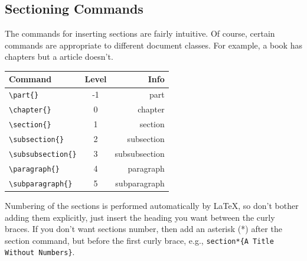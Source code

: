 \documentclass{article}%
\begin{document}
\subsection{Sectioning Commands}
\label{sec:sectioning-commands}
The commands for inserting sections are fairly intuitive.  Of course,
certain commands are appropriate to different document classes.  For
example, a book has chapters but a article doesn't.
\begin{center}
  \begin{tabular}{|l|c|r|}%
    \hline %
    Command & Level & Info \\ %
    \hline
    \verb|\part{}| & -1 & part\\
     \verb|\chapter{}| & 0 &chapter\\
     \verb|\section{}| & 1 &section\\
     \verb|\subsection{}| & 2 &subsection\\
     \verb|\subsubsection{}| & 3 &subsubsection\\
     \verb|\paragraph{}| & 4 & paragraph\\
     \verb|\subparagraph{}| & 5 &subparagraph\\
     \hline
  \end{tabular}
\end{center}
Numbering of the sections is performed automatically by \LaTeX{}, so
don't bother adding them explicitly, just insert the heading you want
between the curly braces.  If you don't want sections number, then add
an asterisk (*) after the section command, but before the first curly
brace, e.g., \verb|section*{A Title Without Numbers}|.
\end{document}

